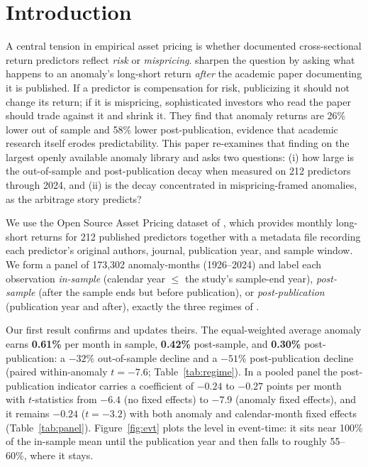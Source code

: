 \documentclass[12pt]{article}
\begin{document}
\newpage
\section{Introduction}
A central tension in empirical asset pricing is whether documented cross-sectional return
predictors reflect \emph{risk} or \emph{mispricing}. \citet{mcleanpontiff2016} sharpen the
question by asking what happens to an anomaly's long-short return \emph{after} the academic
paper documenting it is published. If a predictor is compensation for risk, publicizing it
should not change its return; if it is mispricing, sophisticated investors who read the paper
should trade against it and shrink it. They find that anomaly returns are 26\% lower out of
sample and 58\% lower post-publication, evidence that academic research itself erodes
predictability. This paper re-examines that finding on the largest openly available anomaly
library and asks two questions: (i) how large is the out-of-sample and post-publication decay
when measured on 212 predictors through 2024, and (ii) is the decay concentrated in
mispricing-framed anomalies, as the arbitrage story predicts?

We use the Open Source Asset Pricing dataset of \citet{chenzimmermann2022}, which provides
monthly long-short returns for 212 published predictors together with a metadata file
recording each predictor's original authors, journal, publication year, and sample window.
We form a panel of 173{,}302 anomaly-months (1926--2024) and label each observation
\emph{in-sample} (calendar year $\le$ the study's sample-end year), \emph{post-sample} (after
the sample ends but before publication), or \emph{post-publication} (publication year and
after), exactly the three regimes of \citet{mcleanpontiff2016}.

Our first result confirms and updates theirs. The equal-weighted average anomaly earns
\textbf{0.61\%} per month in sample, \textbf{0.42\%} post-sample, and \textbf{0.30\%}
post-publication: a $-32\%$ out-of-sample decline and a $-51\%$ post-publication decline
(paired within-anomaly $t=-7.6$; Table~\ref{tab:regime}). In a pooled panel the
post-publication indicator carries a coefficient of $-0.24$ to $-0.27$ points per month with
$t$-statistics from $-6.4$ (no fixed effects) to $-7.9$ (anomaly fixed effects), and it
remains $-0.24$ ($t=-3.2$) with both anomaly and calendar-month fixed effects
(Table~\ref{tab:panel}). Figure~\ref{fig:evt} plots the level in event-time: it sits near
100\% of the in-sample mean until the publication year and then falls to roughly 55--60\%,
where it stays.
\end{document}
